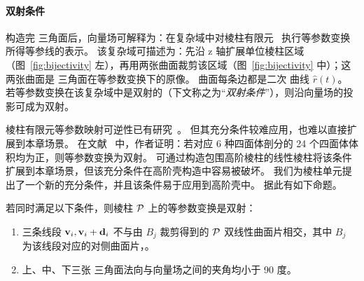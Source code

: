 \paragraph{双射条件}
构造完 \Bezier 三角面后，向量场可解释为：在复杂域中对棱柱有限元~\cite{Ciarlet1991BasicEE} 执行等参数变换所得等参线的表示。
该复杂域可描述为：先沿 z 轴扩展单位棱柱区域（图~\ref{fig:bijectivity} 左），再用两张曲面裁剪该区域（图~\ref{fig:bijectivity} 中）；这两张曲面是 \Bezier 三角面在等参数变换下的原像。
曲面每条边都是二次 \Bezier 曲线 $\hat{r}(t)$。
若等参数变换在该复杂域中是双射的（下文称之为“\emph{双射条件}”），则沿向量场的投影可成为双射。

%
棱柱有限元等参数映射可逆性已有研究~\cite{Knabner2001TheIO}。
但其充分条件较难应用，也难以直接扩展到本章场景。
%
在文献~\cite{Jiang2020BijectivePI} 中，作者证明：若对应 6 种四面体剖分的 24 个四面体体积均为正，则等参数变换为双射。
可通过构造包围高阶棱柱的线性棱柱将该条件扩展到本章场景，但该充分条件在高阶壳构造中容易被破坏。
%
我们为棱柱单元提出了一个新的充分条件，并且该条件易于应用到高阶壳中。
据此有如下命题。
\begin{proposition}\label{prop:bijective}
    若同时满足以下条件，则棱柱 $\mathcal{P}$ 上的等参数变换是双射：
    \begin{enumerate}
    	\item[(\invariant)] 三条线段 $\mathbf{v}_i,\mathbf{v}_i+\mathbf{d}_i$ 不与由 $B_{j}$ 裁剪得到的 $\mathcal{P}$ 双线性曲面片相交，其中 $B_j$ 为该线段对应的对侧曲面片，。
    	\item[(\invariant)] 上、中、下三张 \Bezier 三角面法向与向量场之间的夹角均小于 90 度。
    \end{enumerate}
\end{proposition}
